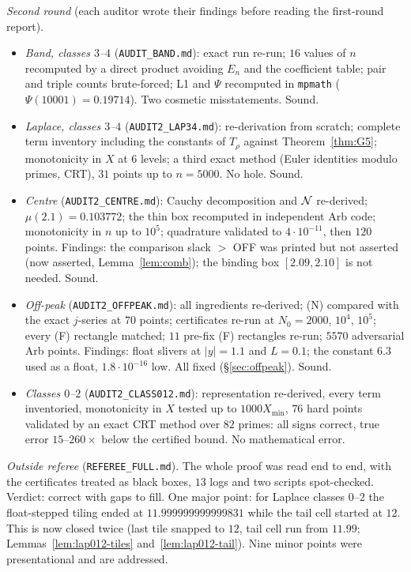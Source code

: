 \emph{Second round} (each auditor wrote their findings before reading the first-round report).
\begin{itemize}
\item \emph{Band, classes $3$--$4$} (\texttt{AUDIT\_BAND.md}): exact run re-run; $16$ values of $n$ recomputed by a direct
product avoiding $E_n$ and the coefficient table; pair and triple counts brute-forced; L1 and $\Psi$ recomputed in
\texttt{mpmath} ($\Psi(10001)=0.19714$). Two cosmetic misstatements. Sound.
\item \emph{Laplace, classes $3$--$4$} (\texttt{AUDIT2\_LAP34.md}): re-derivation from scratch; complete term inventory
including the constants of $T_\rho$ against Theorem~\ref{thm:G5}; monotonicity in $X$ at $6$ levels; a third exact method
(Euler identities modulo primes, CRT), $31$ points up to $n=5000$. No hole. Sound.
\item \emph{Centre} (\texttt{AUDIT2\_CENTRE.md}): Cauchy decomposition and $\mathcal N$ re-derived; $\mu(2.1)=0.103772$; the thin
box recomputed in independent Arb code; monotonicity in $n$ up to $10^5$; quadrature validated to $4\cdot10^{-11}$, then
$120$ points. Findings: the comparison slack $>$ OFF was printed but not asserted (now asserted, Lemma~\ref{lem:comb}); the
binding box $[2.09,2.10]$ is not needed. Sound.
\item \emph{Off-peak} (\texttt{AUDIT2\_OFFPEAK.md}): all ingredients re-derived; (N) compared with the exact $j$-series at
$70$ points; certificates re-run at $N_0=2000$, $10^4$, $10^5$; every (F) rectangle matched; $11$ pre-fix (F) rectangles
re-run; $5570$ adversarial Arb points. Findings: float slivers at $|y|=1.1$ and $L=0.1$; the constant $6.3$ used as a float,
$1.8\cdot10^{-16}$ low. All fixed (\S\ref{sec:offpeak}). Sound.
\item \emph{Classes $0$--$2$} (\texttt{AUDIT2\_CLASS012.md}): representation re-derived, every term inventoried,
monotonicity in $X$ tested up to $1000X_{\min}$, $76$ hard points validated by an exact CRT method over $82$ primes: all
signs correct, true error $15$--$260\times$ below the certified bound. No mathematical error.
\end{itemize}

\emph{Outside referee} (\texttt{REFEREE\_FULL.md}). The whole proof was read end to end, with the certificates treated as
black boxes, $13$ logs and two scripts spot-checked. Verdict: correct with gaps to fill. One major point: for Laplace
classes $0$--$2$ the float-stepped tiling ended at $11.999999999999831$ while the tail cell started at $12$. This is now
closed twice (last tile snapped to $12$, tail cell run from $11.99$; Lemmas~\ref{lem:lap012-tiles}
and~\ref{lem:lap012-tail}). Nine minor points were presentational and are addressed.

